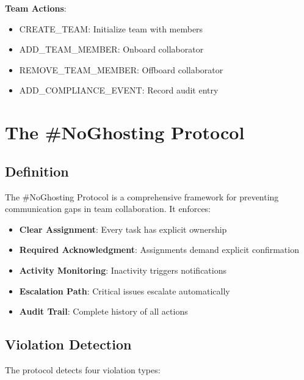 \documentclass[12pt,a4paper]{article}
\begin{document}
\textbf{Team Actions}:
\begin{itemize}
  \item CREATE\_TEAM: Initialize team with members
  \item ADD\_TEAM\_MEMBER: Onboard collaborator
  \item REMOVE\_TEAM\_MEMBER: Offboard collaborator
  \item ADD\_COMPLIANCE\_EVENT: Record audit entry
\end{itemize}

\section{The \#NoGhosting Protocol}

\subsection{Definition}

The \#NoGhosting Protocol is a comprehensive framework for preventing communication gaps in team collaboration. It enforces:

\begin{itemize}
  \item \textbf{Clear Assignment}: Every task has explicit ownership
  \item \textbf{Required Acknowledgment}: Assignments demand explicit confirmation
  \item \textbf{Activity Monitoring}: Inactivity triggers notifications
  \item \textbf{Escalation Path}: Critical issues escalate automatically
  \item \textbf{Audit Trail}: Complete history of all actions
\end{itemize}

\subsection{Violation Detection}

The protocol detects four violation types:
\end{document}
